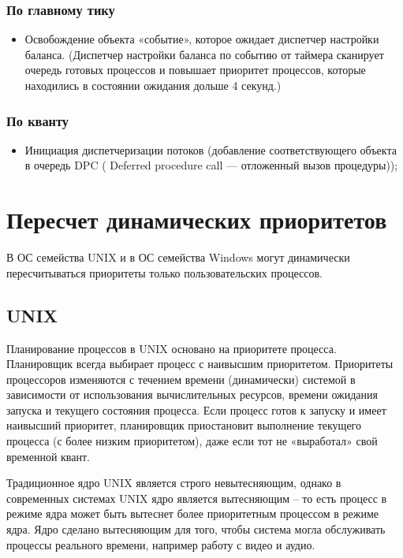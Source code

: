 \subsection*{По главному тику}
\begin{itemize}
	\item Освобождение объекта «событие», которое ожидает диспетчер настройки баланса. (Диспетчер настройки баланса по событию от таймера сканирует очередь готовых процессов и повышает приоритет процессов, которые находились в состоянии ожидания дольше 4 секунд.)
\end{itemize}

\subsection*{По кванту}
\begin{itemize}
	\item Инициация диспетчеризации потоков (добавление соответствующего
	объекта в очередь DPC ( Deferred procedure call — отложенный вызов
	процедуры));
\end{itemize}


\chapter*{Пересчет динамических приоритетов}
В ОС семейства UNIX и в ОС семейства Windows могут динамически пересчитываться приоритеты только
пользовательских процессов.

\section*{UNIX}
Планирование процессов в UNIX основано на приоритете процесса. 
Планировщик всегда выбирает процесс с наивысшим приоритетом. 
Приоритеты процессоров изменяются с течением времени (динамически) системой в зависимости от использования вычислительных ресурсов, времени ожидания запуска и текущего состояния процесса. 
Если процесс готов к запуску и имеет наивысший приоритет, планировщик приостановит выполнение текущего процесса (с более низким приоритетом), даже если тот не «выработал» свой временной квант.

Традиционное ядро UNIX является строго невытесняющим, однако в современных системах UNIX ядро является вытесняющим – то есть процесс в режиме ядра может быть вытеснет более приоритетным процессом в режиме ядра.
Ядро сделано вытесняющим для того, чтобы система могла обслуживать процессы реального времени, например работу с видео и аудио.


